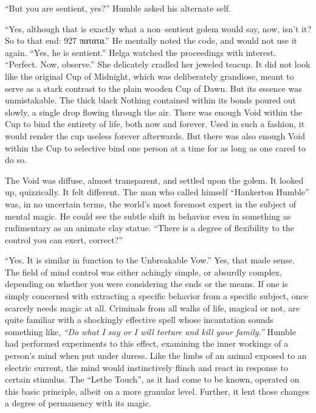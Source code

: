 “But you are sentient, yes?” Humble asked his alternate self.

“Yes, although that is exactly what a non\mbox{--}sentient golem would say, now, isn’t it? So to that end: 927 πατατα.”
\SmallVSpace
He mentally noted the code, and would not use it again. “Yes, he is sentient.”
\SmallVSpace
Helga watched the proceedings with interest. “Perfect. Now, observe.” She delicately cradled her jeweled teacup. It did not look like the original Cup of Midnight, which was deliberately grandiose, meant to serve as a stark contrast to the plain wooden Cup of Dawn. But its essence was unmistakable. The thick black Nothing contained within its bonds poured out slowly, a single drop flowing through the air.
\SmallVSpace
There was enough Void within the Cup to bind the entirety of life, both now and forever. Used in such a fashion, it would render the cup useless forever afterwards. But there was also enough Void within the Cup to selective bind one person at a time for as long as one cared to do so.

The Void was diffuse, almost transparent, and settled upon the golem. It looked up, quizzically. It felt different.
\SmallVSpace
The man who called himself “Hankerton Humble” was, in no uncertain terms, the world’s most foremost expert in the subject of mental magic. He could see the subtle shift in behavior even in something as rudimentary as an animate clay statue. “There is{\el} a degree of flexibility to the control you can exert, correct?”

“Yes. It is similar in function to the Unbreakable Vow.”
\SmallVSpace
Yes, that made sense. The field of mind control was either achingly simple, or absurdly complex, depending on whether you were considering the ends or the means. If one is simply concerned with extracting a specific behavior from a specific subject, once scarcely needs magic at all. Criminals from all walks of life, magical or not, are quite familiar with a shockingly effective spell whose incantation sounds something like, \emph{“Do what I say or I will torture and kill your family.”}
\SmallVSpace
Humble had performed experiments to this effect, examining the inner workings of a person’s mind when put under duress. Like the limbs of an animal exposed to an electric current, the mind would instinctively flinch and react in response to certain stimulus. The “Lethe Touch”, as it had come to be known, operated on this basic principle, albeit on a more granular level. Further, it lent those changes a degree of permanency with its magic.

